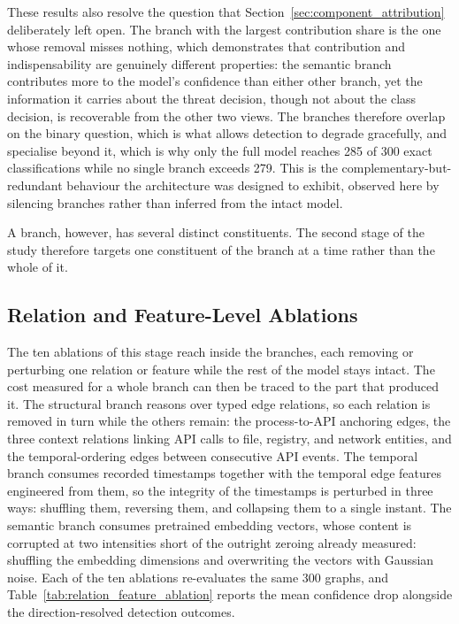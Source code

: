 \documentclass[%
    BCOR=10mm,
    DIV=13,
    toc=bibliography,
    toc=listof,
    oneside,
    12pt,
]{scrbook}
\begin{document}
These results also resolve the question that
Section~\ref{sec:component_attribution} deliberately left open. The branch
with the largest contribution share is the one whose removal misses nothing,
which demonstrates that contribution and indispensability are genuinely
different properties: the semantic branch contributes more to the model's
confidence than either other branch, yet the information it carries about the
threat decision, though not about the class decision, is recoverable from the
other two views. The
branches therefore overlap on the binary question, which is what allows
detection to degrade gracefully, and specialise beyond it, which is why only
the full model reaches 285 of 300 exact classifications while no single
branch exceeds 279. This is the complementary-but-redundant behaviour the
architecture was designed to exhibit, observed here by silencing branches
rather than inferred from the intact model.

A branch, however, has several distinct constituents. The second stage of the
study therefore targets one constituent of the branch at a time rather than
the whole of it.

\subsection{Relation and Feature-Level Ablations}
\label{subsec:relation_feature_ablation}

The ten ablations of this stage reach inside the branches, each removing or
perturbing one relation or feature while the rest of the model stays intact.
The cost measured for a whole branch can then be traced to the part that
produced it. The structural
branch reasons over typed edge relations, so each relation is removed in turn
while the others remain: the process-to-API
anchoring edges, the three context relations linking API calls to file,
registry, and network entities, and the temporal-ordering edges between
consecutive API events. The temporal branch consumes recorded timestamps
together with the temporal edge features engineered from them, so the
integrity of the timestamps is perturbed in three ways: shuffling
them, reversing them, and collapsing them to a single instant. The semantic branch
consumes pretrained embedding vectors, whose content is corrupted at two
intensities short of the outright zeroing already measured: shuffling the
embedding dimensions and overwriting the vectors with Gaussian noise. Each of
the ten ablations re-evaluates the same 300 graphs, and
Table~\ref{tab:relation_feature_ablation} reports the mean confidence drop
alongside the direction-resolved detection outcomes.
\end{document}
